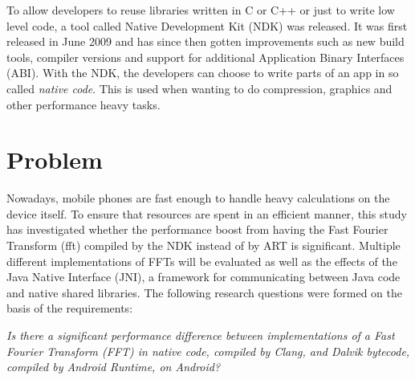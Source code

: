 
To allow developers to reuse libraries written in C or C++ or just to write low level code, a tool called Native Development Kit (NDK) was released. It was first released in June 2009 \cite{Lin2011} and has since then gotten improvements such as new build tools, compiler versions and support for additional Application Binary Interfaces (ABI). With the NDK, the developers can choose to write parts of an app in so called \emph{native code}. This is used when wanting to do compression, graphics and other performance heavy tasks.



\section{Problem}
Nowadays, mobile phones are fast enough to handle heavy calculations on the device itself. To ensure that resources are spent in an efficient manner, this study has investigated whether the performance boost from having the Fast Fourier Transform (\gls{fft}) compiled by the NDK instead of by ART is significant. Multiple different implementations of FFTs will be evaluated as well as the effects of the Java Native Interface (JNI), a framework for communicating between Java code and native shared libraries. The following research questions were formed on the basis of the requirements:



\begin{center}
    \textit{Is there a significant performance difference between implementations of a Fast Fourier Transform (FFT) in native code, compiled by Clang, and Dalvik bytecode, compiled by Android Runtime, on Android?}
\end{center}


